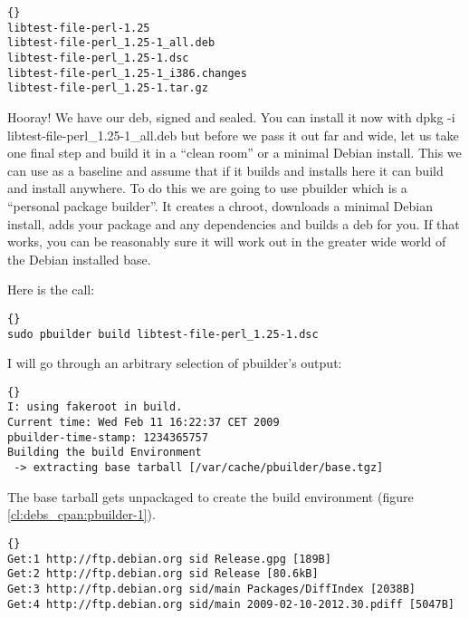 \begin{lstlisting}[frame=trbl,label=cl:debs_cpan:post-dpkg-checkbuilddeps,caption=Directory after successful dpkg-checkbuilddeps run]{}
libtest-file-perl-1.25  
libtest-file-perl_1.25-1_all.deb 
libtest-file-perl_1.25-1.dsc  
libtest-file-perl_1.25-1_i386.changes  
libtest-file-perl_1.25-1.tar.gz
\end{lstlisting}

Hooray! We have our deb, signed and sealed. You can install it now with dpkg -i
libtest-f\hbox{}ile-perl\_1.25-1\_all.deb but before we pass it out far and wide, let
us take one f\hbox{}inal step and build it in a ``clean room'' or a minimal Debian
install. This we can use as a baseline and assume that if it builds and installs
here it can build and install anywhere. To do this we are going to use pbuilder
which is a ``personal package builder''. It creates a chroot, downloads a
minimal Debian install, adds your package and any dependencies and builds a deb
for you. If that works, you can be reasonably sure it will work out in the
greater wide world of the Debian installed base.

Here is the call: 


\begin{lstlisting}[frame=trbl,label=cl:debs_cpan:pbuilder-1,caption=pbuilder command]{}
sudo pbuilder build libtest-file-perl_1.25-1.dsc
\end{lstlisting}

I will go through an arbitrary selection of pbuilder's output:

\begin{lstlisting}[frame=trbl,label=cl:debs_cpan:pbuilder-1,caption=pbuilder output]{}
I: using fakeroot in build.
Current time: Wed Feb 11 16:22:37 CET 2009
pbuilder-time-stamp: 1234365757
Building the build Environment
 -> extracting base tarball [/var/cache/pbuilder/base.tgz]
\end{lstlisting}

The base tarball gets unpackaged to create the build environment (f\hbox{}igure
\ref{cl:debs_cpan:pbuilder-1}).

\begin{lstlisting}[frame=trbl,label=cl:debs_cpan:pbuilder-2,caption=pbuilder process continued]{}
Get:1 http://ftp.debian.org sid Release.gpg [189B]
Get:2 http://ftp.debian.org sid Release [80.6kB]
Get:3 http://ftp.debian.org sid/main Packages/DiffIndex [2038B]
Get:4 http://ftp.debian.org sid/main 2009-02-10-2012.30.pdiff [5047B]
\end{lstlisting}

